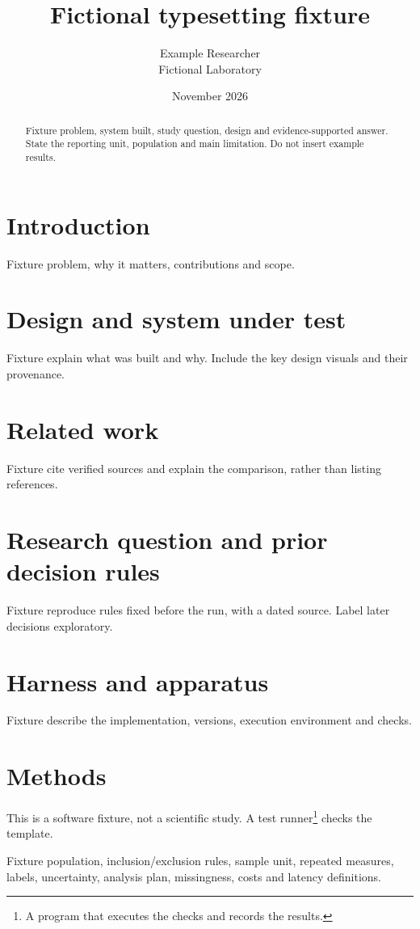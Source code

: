 \documentclass[11pt]{article}
\title{Fictional typesetting fixture}
\author{Example Researcher\\[3pt]\normalsize Fictional Laboratory}
\date{November 2026}
\begin{document}
\maketitle
\thispagestyle{empty}

\begin{abstract}
Fixture problem, system built, study question, design and evidence-supported answer.
State the reporting unit, population and main limitation. Do not insert example results.
\end{abstract}

\section{Introduction}
Fixture problem, why it matters, contributions and scope.

\section{Design and system under test}
Fixture explain what was built and why. Include the key design visuals and their provenance.

\section{Related work}
Fixture cite verified sources and explain the comparison, rather than listing references.

\section{Research question and prior decision rules}
Fixture reproduce rules fixed before the run, with a dated source. Label later decisions exploratory.

\section{Harness and apparatus}
Fixture describe the implementation, versions, execution environment and checks.

\section{Methods}
This is a software fixture, not a scientific study. A test runner\footnote{A program that executes the checks and records the results.} checks the template.\cite{fixture}

Fixture population, inclusion/exclusion rules, sample unit, repeated measures, labels,
uncertainty, analysis plan, missingness, costs and latency definitions.
\end{document}
